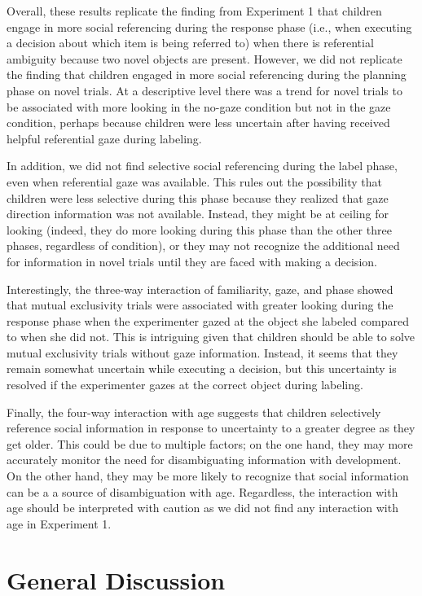 \documentclass[10pt, letterpaper]{article}
\begin{document}
Overall, these results replicate the finding from Experiment 1 that
children engage in more social referencing during the response phase
(i.e., when executing a decision about which item is being referred to)
when there is referential ambiguity because two novel objects are
present. However, we did not replicate the finding that children engaged
in more social referencing during the planning phase on novel trials. At
a descriptive level there was a trend for novel trials to be associated
with more looking in the no-gaze condition but not in the gaze
condition, perhaps because children were less uncertain after having
received helpful referential gaze during labeling.

In addition, we did not find selective social referencing during the
label phase, even when referential gaze was available. This rules out
the possibility that children were less selective during this phase
because they realized that gaze direction information was not available.
Instead, they might be at ceiling for looking (indeed, they do more
looking during this phase than the other three phases, regardless of
condition), or they may not recognize the additional need for
information in novel trials until they are faced with making a decision.

Interestingly, the three-way interaction of familiarity, gaze, and phase
showed that mutual exclusivity trials were associated with greater
looking during the response phase when the experimenter gazed at the
object she labeled compared to when she did not. This is intriguing
given that children should be able to solve mutual exclusivity trials
without gaze information. Instead, it seems that they remain somewhat
uncertain while executing a decision, but this uncertainty is resolved
if the experimenter gazes at the correct object during labeling.

Finally, the four-way interaction with age suggests that children
selectively reference social information in response to uncertainty to a
greater degree as they get older. This could be due to multiple factors;
on the one hand, they may more accurately monitor the need for
disambiguating information with development. On the other hand, they may
be more likely to recognize that social information can be a a source of
disambiguation with age. Regardless, the interaction with age should be
interpreted with caution as we did not find any interaction with age in
Experiment 1.

\section{General Discussion}\label{general-discussion}
\end{document}
